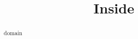 \documentclass{ximera}
\title{Inside}
\begin{document}
\begin{abstract}
domain
\end{abstract}
\maketitle
\end{document}
